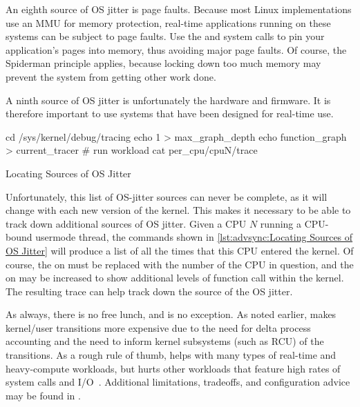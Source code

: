 An eighth source of OS jitter is page faults.
Because most Linux implementations use an MMU for memory protection,
real-time applications running on these systems can be subject
to page faults.
Use the  and  system calls to pin your
application's pages into memory, thus avoiding major page faults.
Of course, the Spiderman principle applies, because locking down
too much memory may prevent the system from getting other work done.

A ninth source of OS jitter is unfortunately the hardware and firmware.
It is therefore important to use systems that have been designed for
real-time use.

\begin{listing}
\begin{fcvlabel}
\begin{VerbatimL}[commandchars=\\\[\]]
cd /sys/kernel/debug/tracing
echo 1 > max_graph_depth		\lnlbl[echo1]
echo function_graph > current_tracer
# run workload
cat per_cpu/cpuN/trace			\lnlbl[cat]
\end{VerbatimL}
\end{fcvlabel}
\caption{Locating Sources of OS Jitter}
\label{lst:advsync:Locating Sources of OS Jitter}
\end{listing}

\begin{fcvref}
Unfortunately, this list of OS-jitter sources can never be complete,
as it will change with each new version of the kernel.
This makes it necessary to be able to track down additional sources
of OS jitter.
Given a CPU $N$ running a CPU-bound usermode thread, the
commands shown in
\cref{lst:advsync:Locating Sources of OS Jitter}
will produce a list of all the times that this CPU entered the kernel.
Of course, the  on  must be replaced with the
number of the CPU in question, and the  on  may be
increased
to show additional levels of function call within the kernel.
The resulting trace can help track down the source of the OS jitter.
\end{fcvref}

As always, there is no free lunch, and  is no exception.
As noted earlier,
 makes kernel/user transitions more expensive due to the
need for delta process accounting and the need to inform kernel subsystems
(such as RCU) of the transitions.
As a rough rule of thumb,  helps with many types of
real-time and heavy-compute workloads, but hurts other workloads
that feature high rates of system calls and
I/O~\cite{AbdullahAljuhni2018nohzfull}.
Additional limitations, tradeoffs, and configuration advice may be
found in .

